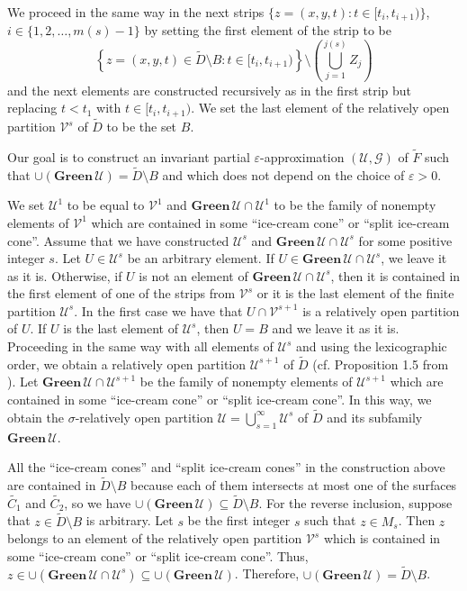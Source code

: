 \documentclass[a4paper]{article}
\begin{document}
We proceed in the same way in the next strips $\{z=(x,y,t) : t \in [t_i,t_{i+1})\}$, $i \in \{1,2,\dots,m(s)-1\}$ by setting the first element of the strip to be $$\left\{z=(x,y,t) \in \widetilde{D} \setminus B : t \in [t_i,t_{i+1})\right\} \setminus \left(\bigcup_{j=1}^{j(s)} Z_{j}\right)$$ and the next elements are constructed recursively as in the first strip but replacing $t<t_1$ with $t \in [t_i,t_{i+1})$. We set the last element of the relatively open partition $\mathcal{V}^s$ of $\widetilde{D}$ to be the set $B$.

Our goal is to construct an invariant partial $\varepsilon$-approximation $(\mathcal{U},\mathcal{G})$ of $\widetilde{F}$ such that $\cup (\mathbf{Green} \,\mathcal{U}) = \widetilde{D} \setminus B$ and which does not depend on the choice of $\varepsilon >0$.

We set $\mathcal{U}^1$ to be equal to $\mathcal{V}^1$ and $\mathbf{Green} \,\mathcal{U} \cap \mathcal{U}^1$ to be the family of nonempty elements of $\mathcal{V}^1$ which are contained in some ``ice-cream cone'' or ``split ice-cream cone''.
Assume that we have constructed $\mathcal{U}^s$ and $\mathbf{Green} \,\mathcal{U} \cap \mathcal{U}^s$ for some positive integer $s$. Let $U \in \mathcal{U}^s$ be an arbitrary element. If $U \in \mathbf{Green} \,\mathcal{U} \cap \mathcal{U}^s$, we leave it as it is. Otherwise, if $U$ is not an element of $\mathbf{Green} \,\mathcal{U} \cap \mathcal{U}^s$, then it is contained in the first element of one of the strips from $\mathcal{V}^s$ or it is the last element of the finite partition $\mathcal{U}^s$. In the first case we have that $U \cap \mathcal{V}^{s+1}$ is a relatively open partition of $U$. If $U$ is the last element of $\mathcal{U}^s$, then $U=B$ and we leave it as it is. Proceeding in the same way with all elements of $\mathcal{U}^s$ and using the lexicographic order, we obtain a relatively open partition $\mathcal{U}^{s+1}$ of $\widetilde{D}$ (cf. Proposition 1.5 from \cite{NR}). Let $\mathbf{Green} \,\mathcal{U} \cap \mathcal{U}^{s+1}$ be the family of nonempty elements of $\mathcal{U}^{s+1}$ which are contained in some ``ice-cream cone'' or ``split ice-cream cone''. In this way, we obtain the $\sigma$-relatively open partition $\mathcal{U} = \bigcup_{s=1}^{\infty} \mathcal{U}^s$ of $\widetilde{D}$ and its subfamily $\mathbf{Green} \,\mathcal{U}$.

All the ``ice-cream cones'' and ``split ice-cream cones'' in the construction above are contained in $\widetilde{D} \setminus B$ because each of them intersects at most one of the surfaces $\widetilde{C_1}$ and $\widetilde{C_2}$, so we have $\cup (\mathbf{Green} \,\mathcal{U}) \subseteq \widetilde{D} \setminus B$. For the reverse inclusion, suppose that $z \in \widetilde{D} \setminus B$ is arbitrary. Let $s$ be the first integer $s$ such that $z \in M_s$. Then $z$ belongs to an element of the relatively open partition $\mathcal{V}^s$ which is contained in some ``ice-cream cone'' or ``split ice-cream cone''. Thus, $z \in \cup (\mathbf{Green} \,\mathcal{U} \cap \mathcal{U}^{s}) \subseteq \cup (\mathbf{Green} \,\mathcal{U})$. Therefore, $\cup (\mathbf{Green} \,\mathcal{U}) = \widetilde{D} \setminus B$.
\end{document}

